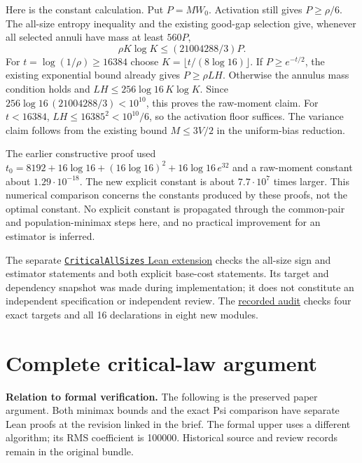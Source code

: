 \documentclass[11pt]{article}
\begin{document}
Here is the constant calculation. Put $P=MW_0$. Activation still gives
$P\ge\rho/6$. The all-size entropy inequality and the existing good-gap
selection give, whenever all selected annuli have mass at least $560P$,
\[
 \rho K\log K\le(21004288/3)P.
\]
For $t=\log(1/\rho)\ge16384$ choose
$K=\lfloor t/(8\log16)\rfloor$. If $P\ge e^{-t/2}$, the existing
exponential bound already gives $P\ge\rho LH$. Otherwise the annulus
mass condition holds and $LH\le256\log16\,K\log K$.
Since $256\log16\,(21004288/3)<10^{10}$, this proves the raw-moment claim.
For $t<16384$, $LH\le16385^2<10^{10}/6$, so the activation floor suffices.
The variance claim follows from the existing bound $M\le3V/2$ in the
uniform-bias reduction.

The earlier constructive proof used
$t_0=8192+16\log16+(16\log16)^2+16\log16\,e^{32}$ and a raw-moment
constant about $1.29\cdot10^{-18}$. The new explicit constant is about
$7.7\cdot10^7$ times larger. This numerical comparison concerns the
constants produced by these proofs, not the optimal constant. No explicit
constant is propagated through the common-pair and population-minimax
steps here, and no practical improvement for an estimator is inferred.

The separate
\href{https://github.com/davidiach/adaptive-threshold-estimation/tree/ebd36676693b66814bc2a379529499428ab98650/lean/ThresholdHC/CriticalAllSizes}{\nolinkurl{CriticalAllSizes} Lean extension}
checks the all-size
sign and estimator statements and both explicit base-cost statements.
Its target and dependency snapshot was made during implementation; it
does not constitute an independent specification or independent review.
The \href{https://github.com/davidiach/adaptive-threshold-estimation/blob/ebd36676693b66814bc2a379529499428ab98650/results/critical_all_sizes_001.json}{recorded audit}
checks four exact targets and all 16 declarations in eight new modules.

\clearpage
\part*{Complete critical-law argument}


\noindent\textbf{Relation to formal verification.} The following is the
preserved paper argument. Both minimax bounds and the exact Psi comparison
have separate Lean proofs at the revision linked in the brief. The formal
upper uses a different algorithm; its RMS coefficient is 100000. Historical
source and review records remain in the original bundle.
\end{document}
